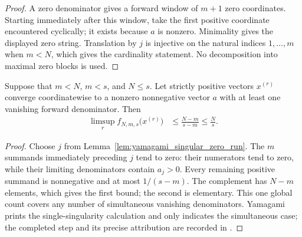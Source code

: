 \begin{proof}
    \leanok
    A zero denominator gives a forward window of $m+1$ zero coordinates.
    Starting immediately after this window, take the first positive
    coordinate encountered cyclically; it exists because $a$ is nonzero.
    Minimality gives the displayed zero string.  Translation by $j$ is
    injective on the natural indices $1,\ldots,m$ when $m<N$, which gives the
    cardinality statement.  No decomposition into maximal zero blocks is
    used.
\end{proof}

\begin{lemma}
    \label{lem:yamagami_simultaneous_singular_boundary}
    \leanok
    Suppose that $m<N$, $m<s$, and $N\le s$.  Let strictly positive vectors
    $x^{(r)}$ converge coordinatewise to a nonzero nonnegative vector $a$ with
    at least one vanishing forward denominator.  Then
    \begin{align}
        \limsup_r f_{N,m,s}\bigl(x^{(r)}\bigr)
          &\le\frac{N-m}{s-m}
          \le\frac Ns.
    \end{align}
\end{lemma}

\begin{proof}
    \leanok
    Choose $j$ from
    Lemma~\ref{lem:yamagami_singular_zero_run}.  The $m$ summands immediately
    preceding $j$ tend to zero: their numerators tend to zero, while their
    limiting denominators contain $a_j>0$.  Every remaining positive summand
    is nonnegative and at most $1/(s-m)$.  The complement has $N-m$ elements,
    which gives the first bound; the second is elementary.  This one global
    count covers any number of simultaneous vanishing denominators.  Yamagami
    prints the single-singularity calculation and only indicates the
    simultaneous case; the completed step and its precise attribution are
    recorded in
    \cite{gap:yamagami_simultaneous_singularity_boundary}.
\end{proof}


